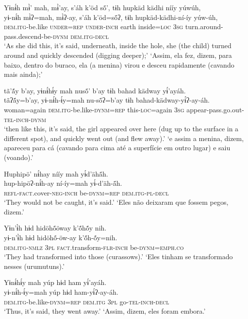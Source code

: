 \documentclass[output=paper,
modfonts,nonflat
]{langsci/langscibook}
\begin{document}
\ea  Yɨnɨ́h mɨ̀’ mah, mɨ̀’ay, s'áh k’öd sö́’, tɨh hupkäd kädhi nííy yúwúh,\\
\gll yɨ-nɨ́h mɨ̀ʔ=mah, mɨ̀ʔ-ay, s'áh k’öd=sö́ʔ, tɨh hupkäd-kädhi-ní-íy yúw-úh,\\
     \textsc{dem.itg-}be.like \textsc{under=rep} \textsc{under-inch} earth inside\textsc{=loc} \textsc{3sg} turn.around-pass.descend-be\textsc{-dynm} \textsc{dem.itg-decl}\\
\glt ‘As she did this, it’s said, underneath, inside the hole, she (the child) turned around and quickly descended (digging deeper);'
\glt ‘Assim, ela fez, dizem, para baixo, dentro do buraco, ela (a menina) virou e desceu rapidamente (cavando mais ainda);'
\z

\newpage
\ea  tã’ã́y b'ay, yɨnɨ́hɨ́y mah nusö́’ b'ay tɨh bahad kädway yɨ́’ayáh.\\
\gll tãʔã́y=b'ay, yɨ-nɨ́h-ɨ́y=mah nu-sö́ʔ=b'ay tɨh bahad-kädway-yɨ́ʔ-ay-áh.\\
     woman=again \textsc{dem.itg-}be.like\textsc{-dynm=rep} this\textsc{-loc}=again \textsc{3sg} appear-pass.go.out\textsc{-tel-inch-dynm}\\
\glt ‘then like this, it’s said, the girl appeared over here (dug up to the surface in a different spot), and quickly went out (and flew away).'
\glt ‘e assim a menina, dizem, apareceu para cá (cavando para cima até a superfície em outro lugar) e saiu (voando).'
\z

\ea  Huphipö’ nɨ́hay nííy mah yɨ́d’ähä́h.\\
\gll hup-hipöʔ-nɨ́h-ay ní-íy=mah yɨ́-d’äh-ä́h.\\
     \textsc{refl-fact.}cover\textsc{-neg-inch} be\textsc{-dynm=rep} \textsc{dem.itg-pl-decl}\\
\glt ‘They would not be caught, it’s said.'
\glt ‘Eles não deixaram que fossem pegos, dizem.'
\z

\ea  Yɨn'ɨ̀h hɨd hidöhö́öway k’ṍhṍy nih.\\
\gll yɨ-n'ɨ̀h hɨd hidöhö́-öw-ay k’ṍh-ṍy=nih.\\
     \textsc{dem.itg-nmlz} \textsc{3pl} \textsc{fact.}transform\textsc{-flr-inch} be\textsc{-dynm=emph.co}\\
\glt ‘They had transformed into those (curassows).'
\glt ‘Eles tinham se transformado nesses (urumutuns).'
\z

\ea  Yɨnɨ́hɨ́y mah yúp hɨd ham yɨ́’ayáh.\\
\gll yɨ-nɨ́h-ɨ́y=mah yúp hɨd ham-yɨ́ʔ-ay-áh.\\
     \textsc{dem.itg-}be.like\textsc{-dynm=rep} \textsc{dem.itg} \textsc{3pl} go\textsc{-tel-inch-decl}\\
\glt ‘Thus, it’s said, they went away.'
\glt ‘Assim, dizem, eles foram embora.'
\z
\end{document}
